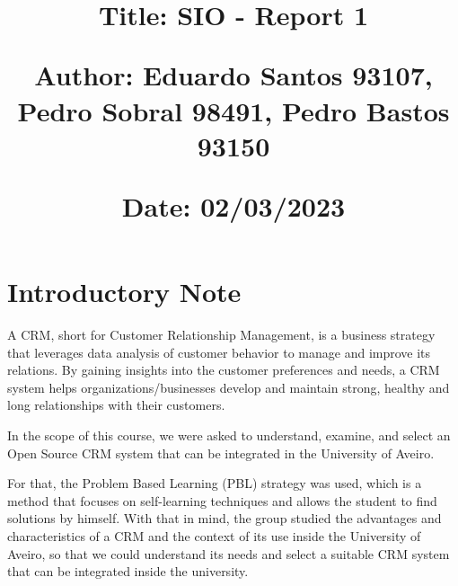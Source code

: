 \documentclass{article}
\begin{document}
\title{\vspace{-0.9cm}
       \vspace{1cm}
       \normalsize
       \raggedright\textbf{Title: \hspace{1.5cm} SIO - Report 1} \\ \vspace{0.4cm}
       \raggedright\textbf{Author: \hspace{1.12cm} Eduardo Santos 93107, Pedro Sobral 98491, Pedro Bastos 93150} \\ \vspace{0.4cm}
       \raggedright\textbf{Date: \hspace{1.48cm} 02/03/2023} \\}
\author{}
\date{}

\maketitle
\thispagestyle{fancy}


\vspace{-1.4cm}

\tableofcontents


\fontsize{10pt}{13pt}
\selectfont
\lsstyle



\section{Introductory Note}

A CRM, short for Customer Relationship Management, is a business strategy that leverages data analysis of customer behavior to manage and improve its relations. By gaining insights into the customer preferences and needs, a CRM system helps organizations/businesses develop and maintain strong, healthy and long relationships with their customers.

In the scope of this course, we were asked to understand, examine, and select an Open Source CRM system that can be integrated in the University of Aveiro.

For that, the Problem Based Learning (PBL) strategy was used, which is a method that focuses on self-learning techniques and allows the student to find solutions by himself. With that in mind, the group studied the advantages and characteristics of a CRM and the context of its use inside the University of Aveiro, so that we could understand its needs and select a suitable CRM system that can be integrated inside the university.
\end{document}
